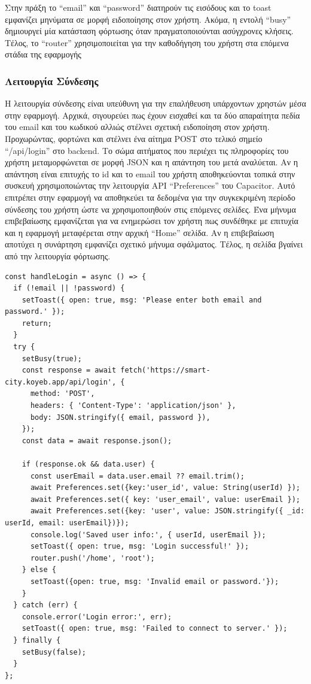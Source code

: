 Στην πράξη το “email” και “password” διατηρούν τις εισόδους και το toast εμφανίζει μηνύματα σε μορφή ειδοποίησης στον χρήστη. Ακόμα, η εντολή “busy” δημιουργεί μία κατάσταση φόρτωσης όταν πραγματοποιούνται ασύγχρονες κλήσεις. Τέλος, το “router” χρησιμοποιείται για την καθοδήγηση του χρήστη στα επόμενα στάδια της εφαρμογής

\subsubsection*{Λειτουργία Σύνδεσης}
Η λειτουργία σύνδεσης είναι υπεύθυνη για την επαλήθευση υπάρχοντων χρηστών μέσα στην εφαρμογή. Αρχικά, σιγουρεύει πως έχουν εισχαθεί και τα δύο απαραίτητα πεδία του email και του κωδικού αλλιώς στέλνει σχετική ειδοποίηση στον χρήστη. Προχωρώντας, φορτώνει και στέλνει ένα αίτημα POST στο τελικό σημείο “/api/login” στο backend. Το σώμα αιτήματος που περιέχει τις πληροφορίες του χρήστη μεταμορφώνεται σε μορφή JSON και η απάντηση του μετά αναλύεται. Αν η απάντηση είναι επιτυχής το id και το email του χρήστη αποθηκεύονται τοπικά στην συσκευή χρησιμοποιώντας την λειτουργία API “Preferences” του Capacitor. Αυτό επιτρέπει στην εφαρμογή να αποθηκεύει τα δεδομένα για την συγκεκριμένη περίοδο σύνδεσης του χρήστη ώστε να χρησιμοποιηθούν στις επόμενες σελίδες. Ένα μήνυμα επιβεβαίωσης εμφανίζεται για να ενημερώσει τον χρήστη πως συνδέθηκε με επιτυχία και η εφαρμογή μεταφέρεται στην αρχική “Home” σελίδα. Αν η επιβεβαίωση αποτύχει η συνάρτηση εμφανίζει σχετικό μήνυμα σφάλματος. Τέλος, η σελίδα βγαίνει από την λειτουργία φόρτωσης.
\\
\begin{lstlisting}
const handleLogin = async () => {
  if (!email || !password) {
    setToast({ open: true, msg: 'Please enter both email and password.' });
    return;
  }
  try {
    setBusy(true);
    const response = await fetch('https://smart-city.koyeb.app/api/login', {
      method: 'POST',
      headers: { 'Content-Type': 'application/json' },
      body: JSON.stringify({ email, password }),
    });
    const data = await response.json();

    if (response.ok && data.user) {
      const userEmail = data.user.email ?? email.trim();
      await Preferences.set({key:'user_id', value: String(userId) });
      await Preferences.set({ key: 'user_email', value: userEmail });
      await Preferences.set({key: 'user', value: JSON.stringify({ _id: userId, email: userEmail})});
      console.log('Saved user info:', { userId, userEmail });
      setToast({ open: true, msg: 'Login successful!' });
      router.push('/home', 'root');
    } else {
      setToast({open: true, msg: 'Invalid email or password.'});
    }
  } catch (err) {
    console.error('Login error:', err);
    setToast({ open: true, msg: 'Failed to connect to server.' });
  } finally {
    setBusy(false);
  }
};
\end{lstlisting}

